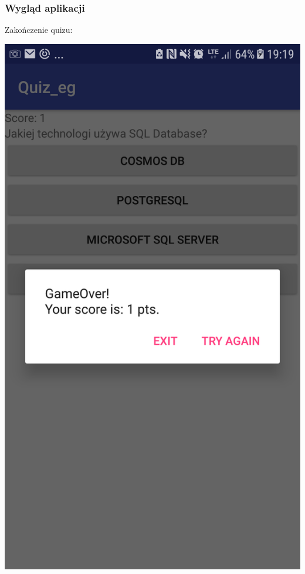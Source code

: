 \documentclass[11pt]{beamer}
\begin{document}
\begin{frame}
\frametitle{Wygląd aplikacji}
Zakończenie quizu:
\begin{center}
\includegraphics[scale=0.15]{../imgs/QuizOver_screenshot.png}
\end{center}
\end{frame}
\end{document}
